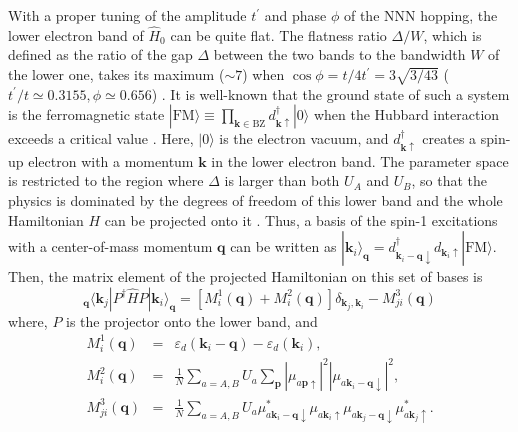 \documentclass[amsmath,superscriptaddress,showpacs,aps,prl,twocolumn]{revtex4-1}
\begin{document}
\par With a proper tuning of the amplitude $t^\prime$ and phase $\phi$ of the NNN hopping, the lower electron band of $\hat{H}_0$ can be quite flat. The flatness ratio $\Delta/W$, which is defined as the ratio of the gap $\Delta$ between the two bands to the bandwidth $W$ of the lower one, takes its maximum ($\sim7$) when $\cos\phi=t/4t^\prime=3\sqrt{3/43}$ ($t^\prime/t\simeq0.3155, \phi\simeq0.656$) \cite{Neupert_PRL2011}. It is well-known that the ground state of such a system is the ferromagnetic state $|\text{FM}\rangle\equiv\prod_{\mathbf{k}\in\text{BZ}}d^\dagger_{\mathbf{k}\uparrow}|0\rangle$ when the Hubbard interaction exceeds a critical value \cite{Tasaki_PRL1994,Su_PRB2019}. Here, $|0\rangle$ is the electron vacuum, and $d^\dagger_{\mathbf{k}\uparrow}$ creates a spin-up electron with a momentum $\mathbf{k}$ in the lower electron band. The parameter space is restricted to the region where $\Delta$ is larger than both $U_A$ and $U_B$, so that the physics is dominated by the degrees of freedom of this lower band and the whole Hamiltonian $H$ can be projected onto it \cite{Neupert_PRL2011,Regnault_PRX2011,Neupert_PRB2011,Neupert_PRL2012,Su_PRB2019}. Thus, a basis of the spin-1 excitations with a center-of-mass momentum $\mathbf{q}$ can be written as $|\mathbf{k}_i\rangle_\mathbf{q}=d^\dagger_{\mathbf{k}_i-\mathbf{q}\downarrow}d_{\mathbf{k}_i\uparrow}|\text{FM}\rangle$. Then, the matrix element of the projected Hamiltonian on this set of bases is
\begin{equation}\label{PHP}
_\mathbf{q}\langle\mathbf{k}_j|P^\dagger \hat{H}P|\mathbf{k}_i\rangle_\mathbf{q}=\left[M_{i}^1(\mathbf{q})+M_{i}^2(\mathbf{q})\right]\delta_{\mathbf{k}_j,\mathbf{k}_i}-M_{ji}^3(\mathbf{q})
\end{equation}
where, $P$ is the projector onto the lower band, and
\begin{eqnarray}
M_{i}^1(\mathbf{q}) &=& \varepsilon_d(\mathbf{k}_i-\mathbf{q})-\varepsilon_d(\mathbf{k}_i), \label{M1}\\
M_{i}^2(\mathbf{q}) &=& \frac{1}{N}\sum_{a=A,B}U_a\sum_{\mathbf{p}}\left|\mu_{a\mathbf{p}\uparrow}\right|^2\left|\mu_{a\mathbf{k}_{i}-\mathbf{q}\downarrow}\right|^2, \label{M2}\\
M_{ji}^3(\mathbf{q}) &=& \frac{1}{N}\sum_{a=A,B}U_a
\mu^{\ast}_{a\mathbf{k}_i-\mathbf{q}\downarrow}\mu_{a\mathbf{k}_{i}\uparrow}\mu_{a\mathbf{k}_j-\mathbf{q}\downarrow}\mu^{\ast}_{a\mathbf{k}_{j}\uparrow}. \label{M3}
\end{eqnarray}
\end{document}

